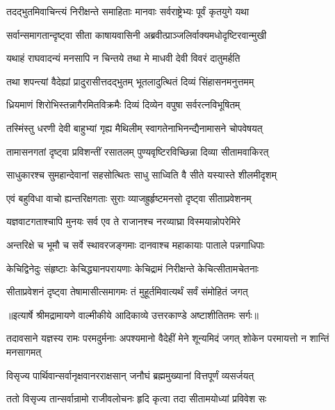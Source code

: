 \twolineshloka
{तदद्भुतमिवाचिन्त्यं निरीक्षन्ते समाहिताः}
{मानवाः सर्वराष्ट्रेभ्यः पूर्वं कृतयुगे यथा} %

\twolineshloka
{सर्वान्समागतान्दृष्ट्वा सीता काषायवासिनी}
{अब्रवीत्प्राञ्जलिर्वाक्यमधोदृष्टिरवान्मुखी} %

\twolineshloka
{यथाहं राघवादन्यं मनसापि न चिन्तये}
{तथा मे माधवी देवी विवरं दातुमर्हति} %

\twolineshloka
{तथा शपन्त्यां वैदेह्यां प्रादुरासीत्तदद्भुतम्}
{भूतलादुत्थितं दिव्यं सिंहासनमनुत्तमम्} %

\twolineshloka
{ध्रियमाणं शिरोभिस्तन्नागैरमितविक्रमैः}
{दिव्यं दिव्येन वपुषा सर्वरत्नविभूषितम्} %

\twolineshloka
{तस्मिंस्तु धरणी देवी बाहुभ्यां गृह्य मैथिलीम्}
{स्वागतेनाभिनन्द्यैनामासने चोपवेषयत्} %

\twolineshloka
{तामासनगतां दृष्ट्वा प्रविशन्तीं रसातलम्}
{पुण्यवृष्टिरविच्छिन्ना दिव्या सीतामवाकिरत्} %

\twolineshloka
{साधुकारश्च सुमहान्देवानां सहसोत्थितः}
{साधु साध्विति वै सीते यस्यास्ते शीलमीदृशम्} %

\twolineshloka
{एवं बहुविधा वाचो ह्यन्तरिक्षगताः सुराः}
{व्याजह्रुर्हृष्टमनसो दृष्ट्वा सीताप्रवेशनम्} %

\twolineshloka
{यज्ञवाटगताश्चापि मुनयः सर्व एव ते}
{राजानश्च नरव्याघ्रा विस्मयान्नोपरेमिरे} %

\twolineshloka
{अन्तरिक्षे च भूमौ च सर्वे स्थावरजङ्गमाः}
{दानवाश्च महाकायाः पाताले पन्नगाधिपाः} %

\twolineshloka
{केचिद्विनेदुः संहृष्टाः केचिद्ध्यानपरायणाः}
{केचिद्रामं निरीक्षन्ते केचित्सीतामचेतनाः} %

\twolineshloka
{सीताप्रवेशनं दृष्ट्वा तेषामासीत्समागमः}
{तं मुहूर्तमिवात्यर्थं सर्वं संमोहितं जगत्} %


{॥इत्यार्षे श्रीमद्रामायणे वाल्मीकीये आदिकाव्ये उत्तरकाण्डे अष्टाशीतितमः सर्गः॥}


\threelineshloka
{तदावसाने यज्ञस्य रामः परमदुर्मनाः}
{अपश्यमानो वैदेहीं मेने शून्यमिदं जगत्}
{शोकेन परमायत्तो न शान्तिं मनसागमत्} %

\twolineshloka
{विसृज्य पार्थिवान्सर्वानृक्षवानरराक्षसान्}
{जनौघं ब्रह्ममुख्यानां वित्तपूर्णं व्यसर्जयत्} %

\twolineshloka
{ततो विसृज्य तान्सर्वान्रामो राजीवलोचनः}
{हृदि कृत्वा तदा सीतामयोध्यां प्रविवेश सः} %

